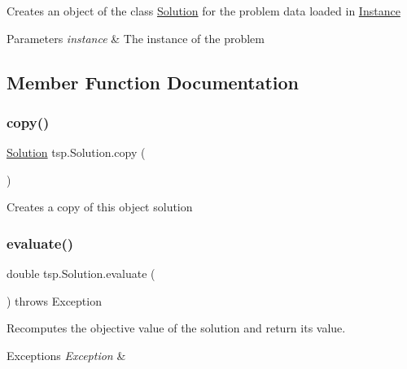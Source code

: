 Creates an object of the class \mbox{\hyperlink{classtsp_1_1_solution}{Solution}} for the problem data loaded in \mbox{\hyperlink{classtsp_1_1_instance}{Instance}} 
\begin{DoxyParams}{Parameters}
{\em instance} & The instance of the problem \\
\hline
\end{DoxyParams}


\subsection{Member Function Documentation}
\mbox{\label{classtsp_1_1_solution_a8d9f2e3624443e569000155e3795bba9}} 
\subsubsection{\texorpdfstring{copy()}{copy()}}
{\footnotesize\ttfamily \mbox{\hyperlink{classtsp_1_1_solution}{Solution}} tsp.\+Solution.\+copy (\begin{DoxyParamCaption}{ }\end{DoxyParamCaption})\hspace{0.3cm}{\ttfamily [inline]}}

Creates a copy of this object solution \mbox{\label{classtsp_1_1_solution_aab96d9400180cc1854a1a48b848f92a4}} 
\subsubsection{\texorpdfstring{evaluate()}{evaluate()}}
{\footnotesize\ttfamily double tsp.\+Solution.\+evaluate (\begin{DoxyParamCaption}{ }\end{DoxyParamCaption}) throws Exception\hspace{0.3cm}{\ttfamily [inline]}}

Recomputes the objective value of the solution and return its value.


\begin{DoxyExceptions}{Exceptions}
{\em Exception} & \\
\hline
\end{DoxyExceptions}
\mbox{\label{classtsp_1_1_solution_a591955a31b69922e07c98958ab129f90}} 
